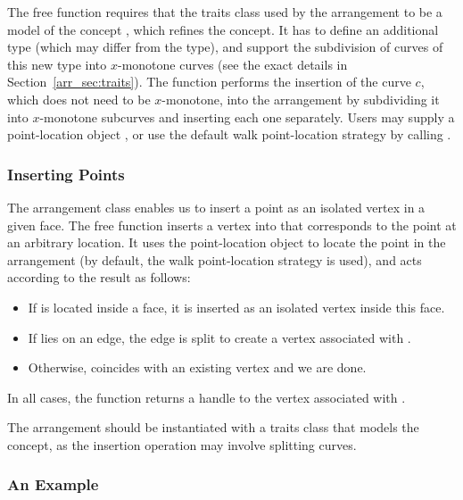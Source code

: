The free function  requires that the traits class
used by the arrangement  to be a model of the concept
, which refines the
 concept. It has to define an
additional  type (which may differ from the
 type), and support the subdivision of curves
of this new type into $x$-monotone curves (see the exact details in
Section~\ref{arr_sec:traits}). The 
function performs the insertion of the curve $c$, which does not need
to be $x$-monotone, into the arrangement by subdividing it into
$x$-monotone subcurves and inserting each one separately. Users
may supply a point-location object , or use the default
walk point-location strategy by calling .

\subsubsection{Inserting Points\label{arr_sssec:insert_point}}

The arrangement class enables us to insert a point as an isolated
vertex in a given face. The free function
 inserts a vertex into  that
corresponds to the point  at an arbitrary location. It uses
the point-location object  to locate the point in the
arrangement (by default, the walk point-location strategy is used),
and acts according to the result as follows:
\begin{itemize}
\item If  is located inside a face, it is inserted as an
isolated vertex inside this face.
\item If  lies on an edge, the edge is split to create a
vertex associated with .
\item Otherwise,  coincides with an existing vertex and
we are done.
\end{itemize}
In all cases, the function returns a handle to the vertex
associated with .

The arrangement  should be instantiated with a traits class
that models the  concept, as the
insertion operation may involve splitting curves.

\subsubsection{An Example\label{arr_sssec:insert_ex}}

